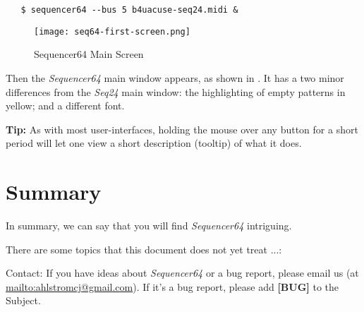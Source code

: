 \documentclass[
 11pt,
 twoside,
 a4paper,
 headinclude,
 footinclude,
 final                                 %
]{article}
\begin{document}
\begin{verbatim}
   $ sequencer64 --bus 5 b4uacuse-seq24.midi &
\end{verbatim}

\begin{figure}[H]
   \centering 
   \texttt{[image: seq64-first-screen.png]}
   \caption{Sequencer64 Main Screen}
   \label{fig:seq64_main_screen}
\end{figure}

   Then the \textsl{Sequencer64} main window appears, as shown in
   .  It has a two minor differences
   from the \textsl{Seq24} main window: the highlighting of
   empty patterns in yellow; and a different font.

   \textbf{Tip:}
   As with most user-interfaces, holding the mouse over any button for a
   short period will let one view a short description (tooltip)
   of what it does.



























% 




\section{Summary}
\label{sec:summary}

   In summary, we can say that you will find \textsl{Sequencer64} intriguing.

   There are some topics that this document does not yet treat ...:

   Contact: If you have ideas about \textsl{Sequencer64} or a bug report, please
   email us (at \url{mailto:ahlstromcj@gmail.com}).
   If it's a bug report, please add \textbf{[BUG]} to the Subject.




\printindex
\end{document}
